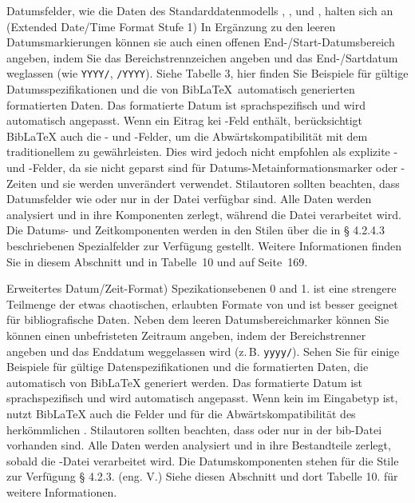 \documentclass{ltxdockit}[2011/03/25]
\newcommand*{\biblatex}{BibLaTeX\xspace}
\newcommand*{\tabrefe}{\refs{Tabelle}{Tabelle}}
\begin{document}
Datumsfelder, wie die Daten des Standarddatenmodells ,
,  und
, halten sich an  (Extended Date/Time Format Stufe 1) In Ergänzung zu den leeren Datumsmarkierungen  können sie auch
einen offenen End-/Start-Datumsbereich angeben, indem Sie das Bereichstrennzeichen angeben und das End-/Sartdatum weglassen (wie \texttt{YYYY/}, \texttt{/YYYY}). Siehe %
Tabelle 3, hier finden Sie Beispiele für gültige 
Datumsspezifikationen und die von \biblatex\ automatisch generierten formatierten Daten. Das formatierte Datum ist sprachspezifisch und wird automatisch angepasst.
Wenn ein Eitrag kei -Feld enthält, berücksichtigt \biblatex auch die - und -Felder, um die Abwärtskompatibilität mit
dem traditionellem \bibtex zu gewährleisten. Dies wird jedoch nicht empfohlen als
explizite - und -Felder, da sie nicht geparst sind
für Datums-Metainformationsmarker oder -Zeiten und sie werden unverändert verwendet.
Stilautoren sollten beachten, dass Datumsfelder wie  oder
 nur in der Datei  verfügbar sind. Alle Daten werden
analysiert und in ihre Komponenten zerlegt, während die Datei 
verarbeitet wird. Die Datums- und Zeitkomponenten werden in den Stilen über die
in § 4.2.4.3 %
beschriebenen Spezialfelder zur Verfügung gestellt.
Weitere Informationen finden Sie in diesem Abschnitt und in Tabelle~10 %
und auf Seite~169.%

Erweitertes Datum/Zeit-Format) Spezikationsebenen 0 and 1.  ist eine strengere Teilmenge der etwas chaotischen, erlaubten Formate von  und ist besser geeignet für bibliografische Daten. Neben dem  leeren Datumsbereichmarker können 
Sie können einen unbefristeten Zeitraum angeben, indem der Bereichstrenner
angeben und das Enddatum weggelassen wird (z.\,B. \texttt{yyyy/}). Sehen Sie
\tabrefe{bib:use:tab1} für einige Beispiele für gültige Datenspezifikationen und
die formatierten Daten, die automatisch von \biblatex generiert werden. Das
formatierte Datum ist sprachspezifisch und wird automatisch angepasst. Wenn kein
 im Eingabetyp ist, nutzt \biblatex auch die Felder
 und  für die Abwärtskompatibilität des
herkömmlichen \bibtex.  Stilautoren sollten beachten, dass  oder
 nur in der bib-Datei vorhanden sind. Alle Daten werden
analysiert und in ihre Bestandteile zerlegt, sobald  die -Datei
verarbeitet wird. Die Datumskomponenten stehen für die Stile zur Verfügung
§ 4.2.3. (eng. V.) Siehe diesen Abschnitt und dort Tabelle 10. %
für weitere Informationen.
\end{document}
